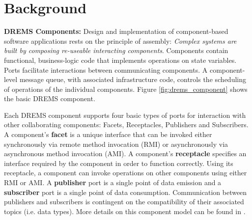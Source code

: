 \vspace{-0.15in}

\section{Background}
\label{sec:Background}

\vspace{-0.1in}


\textbf{DREMS Components:}
Design and implementation of component-based software applications rests on the principle of assembly: \textit{Complex systems are built by composing re-useable interacting components}. Components contain functional, business-logic code that implements operations on state variables. Ports facilitate interactions between communicating components. A component-level message queue, with associated infrastructure code, controls the scheduling of operations of the individual components. Figure \ref{fig:drems_component} shows the basic DREMS component.

Each DREMS component supports four basic types of ports for interaction with other collaborating components: Facets, Receptacles, Publishers and Subscribers. A component's {\bf facet} is a unique interface that can be invoked either synchronously via remote method invocation (RMI) or asynchronously via asynchronous method invocation (AMI). A component's {\bf receptacle} specifies an interface required by the component in order to function correctly. Using its receptacle, a component can invoke operations on other components using either RMI or AMI. A {\bf publisher} port is a single point of data emission and a {\bf subscriber} port is a single point of data consumption. Communication between publishers and subscribers is contingent on the compatibility of their associated topics (i.e. data types). More details on this component model can be found in \cite{ISIS_F6_ISORC:13}.


